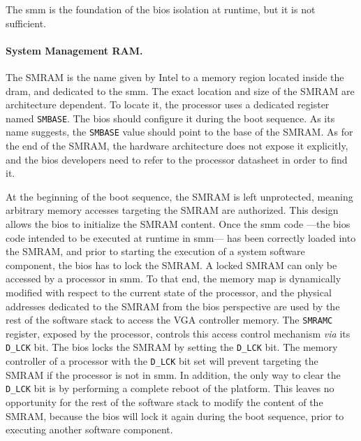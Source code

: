 The \ac{smm} is the foundation of the \ac{bios} isolation at runtime, but it is
not sufficient.

\paragraph{System Management RAM.}
%
The SMRAM is the name given by Intel to a memory region located inside the
\ac{dram}, and dedicated to the \ac{smm}.
%
The exact location and size of the SMRAM are architecture dependent.
%
To locate it, the processor uses a dedicated register named \texttt{SMBASE}.
%
The \ac{bios} should configure it during the boot sequence.
%
As its name suggests, the \texttt{SMBASE} value should point to the base of the
SMRAM.
%
As for the end of the SMRAM, the hardware architecture does not expose it
explicitly, and the \ac{bios} developers need to refer to the processor
datasheet in order to find it.

At the beginning of the boot sequence, the SMRAM is left unprotected, meaning
arbitrary memory accesses targeting the SMRAM are authorized.
%
This design allows the \ac{bios} to initialize the SMRAM content.
%
Once the \ac{smm} code ---the \ac{bios} code intended to be executed at runtime
in \ac{smm}--- has been correctly loaded into the SMRAM, and prior to starting
the execution of a system software component, the \ac{bios} has to lock the
SMRAM.
%
A locked SMRAM can only be accessed by a processor in \ac{smm}.
%
To that end, the memory map is dynamically modified with respect to the current
state of the processor, and the physical addresses dedicated to the SMRAM from
the \ac{bios} perspective are used by the rest of the software stack to access
the VGA controller memory.
%
%
The \texttt{SMRAMC} register, exposed by the processor, controls this access
control mechanism \emph{via} its \texttt{D\_LCK} bit.
%
The \ac{bios} locks the SMRAM by setting the \texttt{D\_LCK} bit.
%
The memory controller of a processor with the \texttt{D\_LCK} bit set will
prevent \IOs targeting the SMRAM if the processor is not in \ac{smm}.
%
In addition, the only way to clear the \texttt{D\_LCK} bit is by performing a
complete reboot of the platform.
%
This leaves no opportunity for the rest of the software stack to modify the
content of the SMRAM, because the \ac{bios} will lock it again during the boot
sequence, prior to executing another software component.

